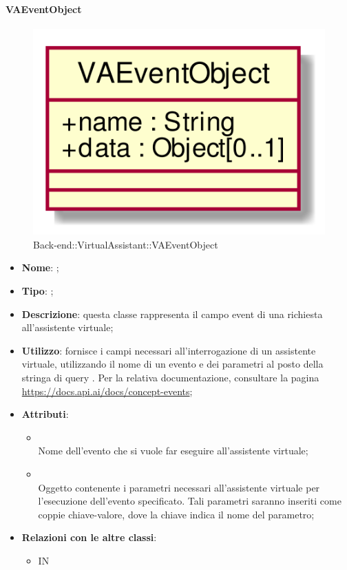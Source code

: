\hypertarget{VAEventObject_label}{\paragraph{VAEventObject}}
\begin{figure}[h]
	\centering
	\includegraphics[width=\textwidth,height=\textheight,keepaspectratio]{images/ClassVAEventObject.png}
	\caption{Back-end::VirtualAssistant::VAEventObject}
\end{figure}
\begin{itemize}
	\item \textbf{Nome}: ;
	\item \textbf{Tipo}: ;
	\item \textbf{Descrizione}: questa classe rappresenta il campo event di una richiesta all'assistente virtuale;
	\item \textbf{Utilizzo}: fornisce i campi necessari all'interrogazione di un assistente virtuale, utilizzando il nome di un evento e dei parametri al posto della stringa di query .
Per la relativa documentazione, consultare la pagina \url{https://docs.api.ai/docs/concept-events};
	\item \textbf{Attributi}:
	\begin{itemize}
		\item[]  \\
		Nome dell'evento che si vuole far eseguire all'assistente virtuale;
		\item[]  \\
		Oggetto contenente i parametri necessari all'assistente virtuale per l'esecuzione dell'evento specificato. Tali parametri saranno inseriti come coppie chiave-valore, dove la chiave indica il nome del parametro;
	\end{itemize}
	\item \textbf{Relazioni con le altre classi}:
	\begin{itemize}
		\item IN \hyperlink{VAQuery_label}{}
	\end{itemize}
\end{itemize}
\FloatBarrier

